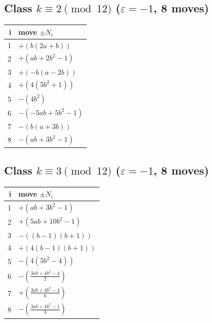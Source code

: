 \subsection*{Class $k\equiv 2\pmod{12}$ \quad ($\varepsilon=-1$, 8 moves)}
\begin{center}\renewcommand{\arraystretch}{1.35}\begin{tabular}{@{}r@{\quad}l@{}}\toprule
i & move $\pm N_i$ \\\midrule
1 & $+(b \left(2 a + b\right))$ \\
2 & $+(a b + 2 b^{2} - 1)$ \\
3 & $+(- b \left(a - 2 b\right))$ \\
4 & $+(4 \left(5 b^{2} + 1\right))$ \\
5 & $-(4 b^{2})$ \\
6 & $-(- 5 a b + 5 b^{2} - 1)$ \\
7 & $-(b \left(a + 3 b\right))$ \\
8 & $-(a b + 3 b^{2} - 1)$ \\
\bottomrule\end{tabular}\end{center}

\subsection*{Class $k\equiv 3\pmod{12}$ \quad ($\varepsilon=-1$, 8 moves)}
\begin{center}\renewcommand{\arraystretch}{1.35}\begin{tabular}{@{}r@{\quad}l@{}}\toprule
i & move $\pm N_i$ \\\midrule
1 & $+(a b + 3 b^{2} - 1)$ \\
2 & $+(5 a b + 10 b^{2} - 1)$ \\
3 & $-(\left(b - 1\right) \left(b + 1\right))$ \\
4 & $+(4 \left(b - 1\right) \left(b + 1\right))$ \\
5 & $-(4 \left(5 b^{2} - 4\right))$ \\
6 & $-(\frac{3 a b + 4 b^{2} - 4}{2})$ \\
7 & $+(\frac{3 a b + 4 b^{2} - 4}{6})$ \\
8 & $-(\frac{3 a b + 4 b^{2} - 1}{3})$ \\
\bottomrule\end{tabular}\end{center}

